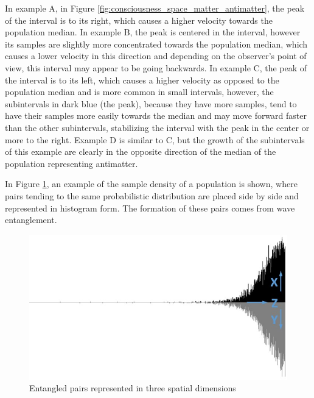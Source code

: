 In example A, in Figure \ref{fig:consciousness_space_matter_antimatter}, the peak of the interval is to its right, which causes a higher velocity towards the population median. In example B, the peak is centered in the interval, however its samples are slightly more concentrated towards the population median, which causes a lower velocity in this direction and depending on the observer's point of view, this interval may appear to be going backwards. In example C, the peak of the interval is to its left, which causes a higher velocity as opposed to the population median and is more common in small intervals, however, the subintervals in dark blue (the peak), because they have more samples, tend to have their samples more easily towards the median and may move forward faster than the other subintervals, stabilizing the interval with the peak in the center or more to the right. Example D is similar to C, but the growth of the subintervals of this example are clearly in the opposite direction of the median of the population representing antimatter.

In Figure \ref{fig:consciousness_space_waves}, an example of the sample density of a population is shown, where pairs tending to the same probabilistic distribution are placed side by side and represented in histogram form. The formation of these pairs comes from wave entanglement.
	\begin{figure}[H]
	\caption{Entangled pairs represented in three spatial dimensions}
	\label{fig:consciousness_space_waves}
	\centering
	\includegraphics[scale=.7]{sections/images/consciousness_space_waves.jpg}
	\end{figure}

